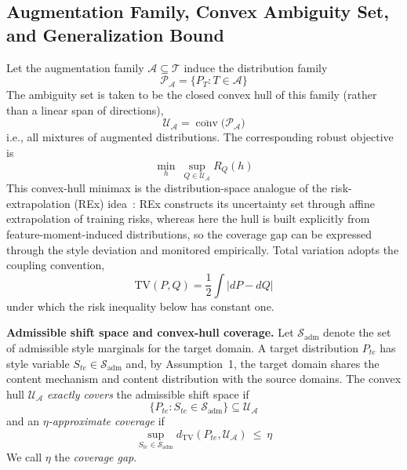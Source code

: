 \documentclass[electronics,article,submit,moreauthors]{Definitions/mdpi}
\begin{document}
\subsection{Augmentation Family, Convex Ambiguity Set, and Generalization Bound}

Let the augmentation family $\mathcal{A}\subseteq\mathcal{T}$ induce the distribution family
\begin{equation}
\mathcal{P}_{\mathcal{A}}=\big\{P_T:T\in\mathcal{A}\big\}
\end{equation}
The ambiguity set is taken to be the closed convex hull of this family (rather than a linear span of directions),
\begin{equation}
\mathcal{U}_{\mathcal{A}}=\overline{\operatorname{conv}}\big(\mathcal{P}_{\mathcal{A}}\big)
\end{equation}
i.e., all mixtures of augmented distributions. The corresponding robust objective is
\begin{equation}
\min_h\ \sup_{Q\in\mathcal{U}_{\mathcal{A}}}R_Q(h)
\end{equation}
This convex-hull minimax is the distribution-space analogue of the risk-extrapolation (REx) idea~\citep{ref43}: REx constructs its uncertainty set through affine extrapolation of training risks, whereas here the hull is built explicitly from feature-moment-induced distributions, so the coverage gap can be expressed through the style deviation and monitored empirically. Total variation adopts the coupling convention,
\begin{equation}
\mathrm{TV}(P,Q)=\frac{1}{2}\int\left|dP-dQ\right|
\end{equation}
under which the risk inequality below has constant one.

\noindent\textbf{Admissible shift space and convex-hull coverage.} Let $\mathcal{S}_{\mathrm{adm}}$ denote the set of admissible style marginals for the target domain. A target distribution $P_{te}$ has style variable $S_{te}\in\mathcal{S}_{\mathrm{adm}}$ and, by Assumption~1, the target domain shares the content mechanism and content distribution with the source domains. The convex hull $\mathcal{U}_{\mathcal{A}}$ \emph{exactly covers} the admissible shift space if
\begin{equation}
\{P_{te}:S_{te}\in\mathcal{S}_{\mathrm{adm}}\}\subseteq\mathcal{U}_{\mathcal{A}}
\end{equation}
and an \emph{$\eta$-approximate coverage} if
\begin{equation}
\sup_{S_{te}\in\mathcal{S}_{\mathrm{adm}}} d_{\mathrm{TV}}(P_{te},\mathcal{U}_{\mathcal{A}})\ \le\ \eta
\end{equation}
We call $\eta$ the \emph{coverage gap}.
\end{document}
